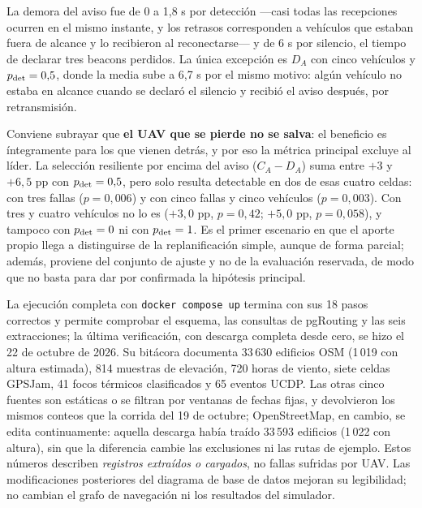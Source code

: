 \documentclass[journal,10pt]{IEEEtran}
\begin{document}
La demora del aviso fue de 0 a 1,8 s por detección ---casi todas las
recepciones ocurren en el mismo instante, y los retrasos corresponden a
vehículos que estaban fuera de alcance y lo recibieron al reconectarse--- y
de 6 s por silencio, el tiempo de declarar tres beacons perdidos. La única
excepción es $D_A$ con cinco vehículos y $p_{\rm det}=0{,}5$, donde la media
sube a 6,7 s por el mismo motivo: algún vehículo no estaba en alcance cuando
se declaró el silencio y recibió el aviso después, por retransmisión.

Conviene subrayar que \textbf{el UAV que se pierde no se salva}: el
beneficio es íntegramente para los que vienen detrás, y por eso la métrica
principal excluye al líder. La selección resiliente por encima del aviso
($C_A-D_A$) suma entre $+3$ y $+6{,}5$ pp con $p_{\rm det}=0{,}5$, pero solo
resulta detectable en dos de esas cuatro celdas: con tres fallas ($p=0{,}006$)
y con cinco fallas y cinco vehículos ($p=0{,}003$). Con tres y cuatro vehículos
no lo es ($+3{,}0$ pp, $p=0{,}42$; $+5{,}0$ pp, $p=0{,}058$), y tampoco con
$p_{\rm det}=0$ ni con $p_{\rm det}=1$. Es el primer escenario en que el
aporte propio llega a distinguirse de la replanificación simple, aunque de
forma parcial; además, proviene del conjunto de ajuste y no de la evaluación
reservada, de modo que no basta para dar por confirmada la hipótesis
principal.

La ejecución completa con \texttt{docker compose up} termina con sus 18 pasos
correctos y permite comprobar el esquema, las consultas de pgRouting y las
seis extracciones; la última verificación, con descarga completa desde cero,
se hizo el 22 de octubre de 2026. Su bitácora documenta 33\,630 edificios OSM
(1\,019 con altura estimada), 814 muestras de elevación, 720 horas de viento,
siete celdas GPSJam, 41 focos térmicos clasificados y 65 eventos UCDP. Las
otras cinco fuentes son estáticas o se filtran por ventanas de fechas fijas,
y devolvieron los mismos conteos que la corrida del 19 de octubre;
OpenStreetMap, en cambio, se edita continuamente: aquella descarga había
traído 33\,593 edificios (1\,022 con altura), sin que la diferencia cambie las
exclusiones ni las rutas de ejemplo. Estos números
describen \emph{registros extraídos o cargados}, no fallas sufridas por UAV. Las
modificaciones posteriores del diagrama de base de datos mejoran su
legibilidad; no cambian el grafo de navegación ni los resultados del
simulador.
\end{document}
